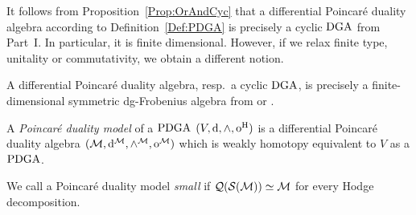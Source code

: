 \documentclass[\MainFolder/Text.tex]{subfiles}
\begin{document}
It follows from Proposition~\ref{Prop:OrAndCyc} that a differential Poincar\'e duality algebra according to Definition~\ref{Def:PDGA} is precisely a cyclic $\mathrm{DGA}$ from Part~I. In particular, it is finite dimensional. However, if we relax finite type, unitality or commutativity, we obtain a different notion.

\begin{Remark}
A differential Poincar\'e duality algebra, resp.~a cyclic $\mathrm{DGA}$, is precisely a finite-dimensional symmetric dg-Frobenius algebra from \cite[p.~13]{Vallette2012} or \cite[Theorem~1.1]{Cohen2006}. 
\end{Remark}

\begin{Definition}\label{Def:PDModel}
A \emph{Poincar\'e duality model} of a $\mathrm{PDGA}$ $(V,\mathrm{d},\wedge,\mathrm{o}^{\mathrm{H}})$ is a differential Poincar\'e duality algebra $(\mathcal{M},\mathrm{d}^{\mathcal{M}},\wedge^{\mathcal{M}},\mathrm{o}^{\mathcal{M}})$ which is weakly homotopy equivalent to $V$ as a $\mathrm{PDGA}$.

We call a Poincar\'e duality model \emph{small} if $\mathcal{Q}(\mathcal{S}(\mathcal{M})) \simeq \mathcal{M}$ for every Hodge decomposition.
\end{Definition}
\end{document}
